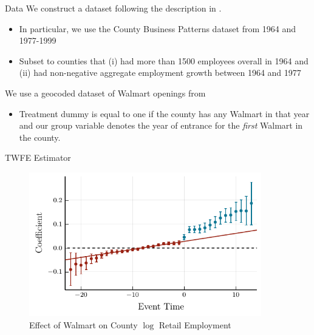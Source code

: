 \documentclass[aspectratio=43,t]{beamer}
\begin{document}
\begin{frame}{Data}
  We construct a dataset following the description in \citet{basker2005job}. 
  
  \begin{itemize}
    \item In particular, we use the County Business Patterns dataset from 1964 and 1977-1999
    \item Subset to counties that (i) had more than 1500 employees overall in 1964 and (ii) had non-negative aggregate employment growth between 1964 and 1977
  \end{itemize}

  \smallskip\pause
  We use a geocoded dataset of Walmart openings from \citet{arcidiacono2020competitive}

  \begin{itemize}
    \item Treatment dummy is equal to one if the county has any Walmart in that year and our group variable denotes the year of entrance for the \emph{first} Walmart in the county.
  \end{itemize}
\end{frame}

\begin{frame}{TWFE Estimator}
  \begin{figure}
    \caption{Effect of Walmart on County $\log$ Retail Employment}
    \includegraphics[width = 0.9\textwidth]{../../figures/did2s_retail_bootstrap_1000.pdf}
  \end{figure}
\end{frame}
\end{document}
